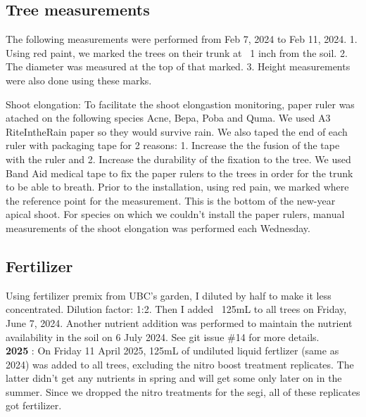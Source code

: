 \documentclass{article}
\begin{document}
\subsection{Tree measurements}
The following measurements were performed from Feb 7, 2024 to Feb 11, 2024.
1. Using red paint, we marked the trees on their trunk at ~1 inch from the soil. 2. The diameter was measured at the top of that marked. 3. Height measurements were also done using these marks. 
\par
Shoot elongation: To facilitate the shoot elongastion monitoring,  paper ruler was atached on the following species Acne, Bepa, Poba and Quma. We used A3 RiteIntheRain paper so they would survive rain. We also taped the end of each ruler with packaging tape for 2 reasons: 1. Increase the the fusion of the tape with the ruler and 2. Increase the durability of the fixation to the tree. We used Band Aid medical tape to fix the paper rulers to the trees in order for the trunk to be able to breath. Prior to the installation, using red pain, we marked where the reference point for the measurement. This is the bottom of the new-year apical shoot. For species on which we couldn't install the paper rulers, manual measurements of the shoot elongation was performed each Wednesday. 
\subsection {Fertilizer}
Using fertilizer premix from UBC's garden, I diluted by half to make it less concentrated. Dilution factor: 1:2. Then I added ~125mL to all trees on Friday, June 7, 2024. Another nutrient addition was performed to maintain the nutrient availability in the soil on 6 July 2024. See git issue \#14 for more details. \\
\textbf{2025} : On Friday 11 April 2025, 125mL of undiluted liquid fertlizer (same as 2024) was added to all trees, excluding the nitro boost treatment replicates. The latter didn't get any nutrients in spring and will get some only later on in the summer. Since we dropped the nitro treatments for the segi, all of these replicates got fertilizer. 
\end{document}
